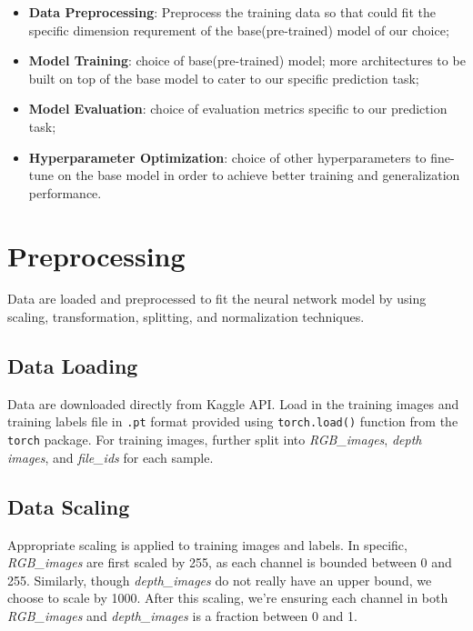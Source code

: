 \documentclass[11pt]{article}
\begin{document}
\begin{itemize}
\item
  \textbf{Data Preprocessing}: Preprocess the training data so that
  could fit the specific dimension requrement of the base(pre-trained)
  model of our choice;
\item
  \textbf{Model Training}: choice of base(pre-trained) model; more
  architectures to be built on top of the base model to cater to our
  specific prediction task;
\item
  \textbf{Model Evaluation}: choice of evaluation metrics specific to
  our prediction task;
\item
  \textbf{Hyperparameter Optimization}: choice of other hyperparameters
  to fine-tune on the base model in order to achieve better training and
  generalization performance.
\end{itemize}

    \hypertarget{preprocessing}{%
\section{Preprocessing}\label{preprocessing}}

Data are loaded and preprocessed to fit the neural network model by
using scaling, transformation, splitting, and normalization techniques.

    \hypertarget{data-loading}{%
\subsection{Data Loading}\label{data-loading}}

Data are downloaded directly from Kaggle API. Load in the training
images and training labels file in \texttt{.pt} format provided using
\texttt{torch.load()} function from the \texttt{torch} package. For
training images, further split into \emph{RGB\_images}, \emph{depth
images}, and \emph{file\_ids} for each sample.

    \hypertarget{data-scaling}{%
\subsection{Data Scaling}\label{data-scaling}}

Appropriate scaling is applied to training images and labels. In
specific, \emph{RGB\_images} are first scaled by 255, as each channel is
bounded between 0 and 255. Similarly, though \emph{depth\_images} do not
really have an upper bound, we choose to scale by 1000. After this
scaling, we're ensuring each channel in both \emph{RGB\_images} and
\emph{depth\_images} is a fraction between 0 and 1.
\end{document}
